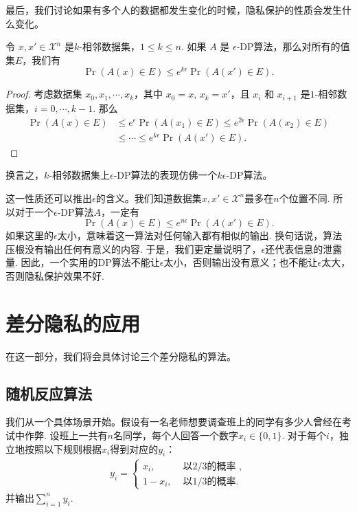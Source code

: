 最后，我们讨论如果有多个人的数据都发生变化的时候，隐私保护的性质会发生什么变化。

\begin{proposition}[群体隐私]\label{prop:group-privacy}
    令 $x, x' \in \mathcal X^n$ 是$k$-相邻数据集，$1 \leq k \leq n$. 如果 $A$ 是 $\epsilon$-DP算法，那么对所有的值集$E$，我们有
    \[
    \Pr(A(x) \in E) \leq e^{k\epsilon}\Pr(A(x') \in E).
    \]
\end{proposition}
\begin{proof}
    考虑数据集 $x_0, x_1, \cdots , x_k$，其中 $x_0 = x$, $x_k = x'$，且 $x_i$ 和 $x_{i+1}$ 是$1$-相邻数据集，$i = 0, \cdots, k-1$. 那么
    \[
    \begin{aligned}
    \Pr(A(x) \in E) &\leq e^{\epsilon}\Pr(A(x_1) \in E) \leq e^{2\epsilon}\Pr(A(x_2) \in E)\\
    &\leq \cdots \leq e^{k\epsilon}\Pr(A(x') \in E).
    \end{aligned}
    \]
\end{proof}

换言之，$k$-相邻数据集上$\epsilon$-DP算法的表现仿佛一个$k\epsilon$-DP算法。

这一性质还可以推出$\epsilon$的含义。我们知道数据集$x, x' \in \mathcal X^n$最多在$n$个位置不同. 所以对于一个$\epsilon$-DP算法$A$，一定有
        \[
        \Pr(A(x) \in E) \leq e^{n\epsilon}\Pr(A(x') \in E).
        \]
如果这里的$\epsilon$太小，意味着这一算法对任何输入都有相似的输出. 换句话说，算法压根没有输出任何有意义的内容. 于是，我们更定量说明了，$\epsilon$还代表信息的泄露量. 因此，一个实用的DP算法不能让$\epsilon$太小，否则输出没有意义；也不能让$\epsilon$太大，否则隐私保护效果不好.

\section{差分隐私的应用}
在这一部分，我们将会具体讨论三个差分隐私的算法。

\subsection{随机反应算法}
我们从一个具体场景开始。假设有一名老师想要调查班上的同学有多少人曾经在考试中作弊. 设班上一共有$n$名同学，每个人回答一个数字$x_i \in \{0,1\}$. 对于每个$i$，独立地按照以下规则根据$x_i$得到对应的$y_i$：
\[\begin{aligned}
    y_i =
    \begin{cases}
        x_i, & \text{ 以$2/3$的概率 }, \\
        1 - x_i,& \text{ 以$1/3$的概率}.
    \end{cases}
\end{aligned}\]
并输出$\sum_{i=1}^n y_i$. 

